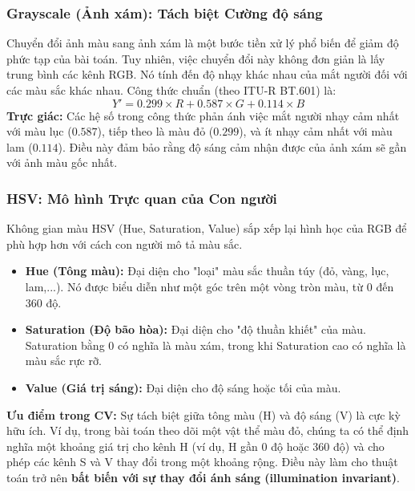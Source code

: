 \subsubsection{Grayscale (Ảnh xám): Tách biệt Cường độ sáng}
\label{subsubsec:grayscale}
Chuyển đổi ảnh màu sang ảnh xám là một bước tiền xử lý phổ biến để giảm độ phức tạp của bài toán. Tuy nhiên, việc chuyển đổi này không đơn giản là lấy trung bình các kênh RGB. Nó tính đến độ nhạy khác nhau của mắt người đối với các màu sắc khác nhau. Công thức chuẩn (theo ITU-R BT.601) là:
\begin{equation}
    Y' = 0.299 \times R + 0.587 \times G + 0.114 \times B
    \label{eq:grayscale_conversion}
\end{equation}
\textbf{Trực giác:} Các hệ số trong công thức phản ánh việc mắt người nhạy cảm nhất với màu lục ($0.587$), tiếp theo là màu đỏ ($0.299$), và ít nhạy cảm nhất với màu lam ($0.114$). Điều này đảm bảo rằng độ sáng cảm nhận được của ảnh xám sẽ gần với ảnh màu gốc nhất.

\subsubsection{HSV: Mô hình Trực quan của Con người}
\label{subsubsec:hsv_colorspace}
Không gian màu HSV (Hue, Saturation, Value) sắp xếp lại hình học của RGB để phù hợp hơn với cách con người mô tả màu sắc.
\begin{itemize}
    \item \textbf{Hue (Tông màu):} Đại diện cho "loại" màu sắc thuần túy (đỏ, vàng, lục, lam,...). Nó được biểu diễn như một góc trên một vòng tròn màu, từ 0 đến 360 độ.
    \item \textbf{Saturation (Độ bão hòa):} Đại diện cho "độ thuần khiết" của màu. Saturation bằng 0 có nghĩa là màu xám, trong khi Saturation cao có nghĩa là màu sắc rực rỡ.
    \item \textbf{Value (Giá trị sáng):} Đại diện cho độ sáng hoặc tối của màu.
\end{itemize}
\textbf{Ưu điểm trong CV:} Sự tách biệt giữa tông màu (H) và độ sáng (V) là cực kỳ hữu ích. Ví dụ, trong bài toán theo dõi một vật thể màu đỏ, chúng ta có thể định nghĩa một khoảng giá trị cho kênh H (ví dụ, H gần 0 độ hoặc 360 độ) và cho phép các kênh S và V thay đổi trong một khoảng rộng. Điều này làm cho thuật toán trở nên \textbf{bất biến với sự thay đổi ánh sáng (illumination invariant)}.


